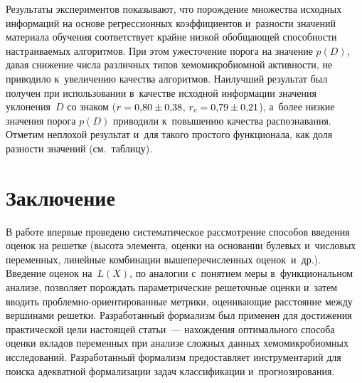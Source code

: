 \begin{multicols}{2}
    
Результаты экспериментов показывают, что по\-рож\-де\-ние множества 
исходных информаций на основе регрессионных коэффициентов и~раз\-ности 
значений материала обуче\-ния соответствует крайне низкой обоб\-ща\-ющей 
спо\-соб\-ности на\-стра\-и\-ва\-емых алгоритмов. При этом ужес\-то\-че\-ние порога на 
значение $p(D)$, давая  снижение чис\-ла раз\-лич\-ных типов 
хе\-мо\-мик\-ро\-биом\-ной ак\-тив\-ности, не приводило к~увеличению качества 
ал\-го\-рит\-мов. Наилучший результат был получен при использовании 
в~качестве исходной информации значения уклонения~$D$ со знаком 
($r\hm=0{,}80\pm0{,}38$, $r_c\hm=0{,}79\hm\pm 0{,}21$), а~более низ\-кие 
значения порога $p(D)$ приводили к~повышению качества распознавания. 
Отметим не\-пло\-хой результат и~для такого прос\-то\-го функционала, как доля 
раз\-ности значений (см.\ таб\-ли\-цу).

\vspace*{-5pt}

\section{Заключение}

\vspace*{-1pt}

    В работе впервые проведено сис\-те\-ма\-ти\-че\-ское рас\-смот\-ре\-ние способов 
введения оценок на решетке (высота элемента, оцен\-ки на основании булевых 
и~чис\-ло\-вых переменных, линейные комбинации вы\-ше\-пе\-ре\-чис\-лен\-ных 
оценок~и~др.). Введение оценок на~$L(X)$, по аналогии с~понятием меры 
в~функциональном анализе, поз\-во\-ля\-ет по\-рож\-дать па\-ра\-мет\-ри\-че\-ские 
решеточные оценки и~затем вво\-дить проб\-лем\-но-ори\-ен\-ти\-ро\-ван\-ные мет\-ри\-ки, 
оце\-ни\-ва\-ющие рас\-сто\-яние между вершинами решетки. Разработанный 
формализм был применен для до\-сти\-же\-ния практической цели на\-сто\-ящей 
статьи~--- на\-хож\-де\-ния оптимального способа оцен\-ки вкладов переменных 
при анализе слож\-ных данных хе\-мо\-мик\-ро\-би\-ом\-ных исследований. 
Разработанный формализм пред\-остав\-ля\-ет инструментарий для поиска 
аде\-кват\-ной формализации задач классификации и~прогнозирования.

\vspace*{-5pt}

{\small\frenchspacing
 { %
 \begin{thebibliography}{9}
 
 \vspace*{-1pt}
 

\end{thebibliography}}}
\end{multicols}
